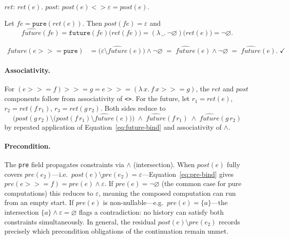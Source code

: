\documentclass[acmsmall,screen]{acmart}
\newcommand{\pre}{\mathit{pre}}
\newcommand{\post}{\mathit{post}}
\newcommand{\fut}{\mathit{future}}
\newcommand{\ret}{\mathit{ret}}
\newcommand{\univ}{\neg\varnothing}
\begin{document}
$\ret$: $\ret(e)$. \checkmark \quad
$\post$: $\post(e) \mathbin{<>} \varepsilon = \post(e)$. \checkmark

Let $fe = \mathtt{pure}(\ret(e))$.
Then $\post(fe) = \varepsilon$ and
\[
  \widehat{\fut}(fe)
    = \mathtt{future}(fe)\bigl(\ret(fe)\bigr)
    = (\lambda\,\_.\ \univ)\bigl(\ret(e)\bigr)
    = \univ.
\]

\begin{align*}
  \widehat{\fut}(e \mathbin{>\!\!>\!\!=} \mathtt{pure})
    &= \bigl(\varepsilon \setminus \widehat{\fut}(e)\bigr)
       \wedge \univ
     \;=\; \widehat{\fut}(e) \wedge \univ
     \;=\; \widehat{\fut}(e). \;\checkmark
\end{align*}

\paragraph{Associativity.}
For $(e \mathbin{>\!\!>\!\!=} f) \mathbin{>\!\!>\!\!=} g = e \mathbin{>\!\!>\!\!=} (\lambda\,x.\ f\,x \mathbin{>\!\!>\!\!=} g)$,
the $\ret$ and $\post$ components follow from associativity of
\lstinline{<>}.
For the future, let $r_1 = \ret(e)$, $r_2 = \ret(f\,r_1)$, $r_3 = \ret(g\,r_2)$.
Both sides reduce to
\[
  \bigl(\post(g\,r_2) \setminus
        \bigl(\post(f\,r_1) \setminus \widehat{\fut}(e)\bigr)\bigr)
  \;\wedge\; \widehat{\fut}(f\,r_1)
  \;\wedge\; \widehat{\fut}(g\,r_2)
\]
by repeated application of Equation~\eqref{eq:future-bind} and
associativity of $\wedge$.

\paragraph{Precondition.}
The \lstinline{pre} field propagates constraints via $\wedge$ (intersection).
When $\post(e)$ fully covers $\pre(e_2)$---i.e.\
$\post(e) \setminus \pre(e_2) = \varepsilon$---Equation~\eqref{eq:pre-bind}
gives $\pre(e \mathbin{>\!\!>\!\!=} f) = \pre(e) \wedge \varepsilon$.
If $\pre(e) = \univ$ (the common case for pure computations) this reduces
to $\varepsilon$, meaning the composed computation can run from an empty
start.
If $\pre(e)$ is non-nullable---e.g.\ $\pre(e) = \{a\}$---the intersection
$\{a\} \wedge \varepsilon = \varnothing$ flags a contradiction: no history
can satisfy both constraints simultaneously.
In general, the residual $\post(e) \setminus \pre(e_2)$ records
precisely which precondition obligations of the continuation remain unmet.

\end{document}
